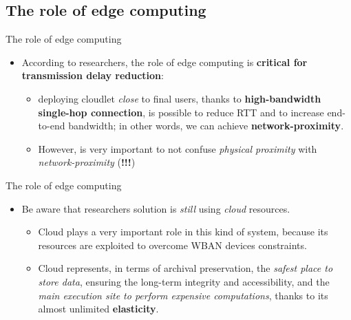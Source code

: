 \documentclass[10pt]{beamer}
\begin{document}
\subsection{The role of edge computing}
\begin{frame}{The role of edge computing} 

\begin{itemize}

\item According to researchers, the role of edge computing is \textbf{critical for transmission delay reduction}:

\begin{itemize}
\item deploying cloudlet \textit{close} to final users, thanks to \textbf{high-bandwidth single-hop connection}, is possible to reduce RTT and to increase end-to-end bandwidth; in other words, we can achieve \textbf{network-proximity}.\citep{TheSeminalRoleEdgeNativeApplications}

\item However, is very important to not confuse \textit{physical proximity} with \textit{network-proximity} (\textbf{!!!})
\end{itemize}

\end{itemize}

\end{frame} 
\begin{frame}{The role of edge computing} 

\begin{itemize}

\item Be aware that researchers solution is \textit{still} using \textit{cloud} resources.

\begin{itemize}
\item Cloud plays a very important role in this kind of system, because its resources are exploited to overcome WBAN devices constraints.
\item Cloud represents, in terms of archival preservation, the \textit{safest place to store data}, ensuring the long-term integrity and accessibility, and the \textit{main execution site to perform expensive computations}, thanks to its almost unlimited \textbf{elasticity}.
\end{itemize}

\end{itemize}

\end{frame} 
\end{document}
